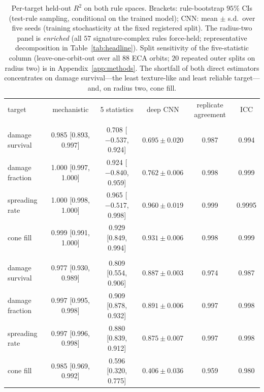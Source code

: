 \documentclass[aip,cha,amsmath,amssymb,reprint,floatfix]{revtex4-2}
\newcommand{\rtwo}{$R^2$}
\begin{document}
\begin{table}[t]
\centering
\begin{ruledtabular}
\begin{tabular}{lccccc}
target & mechanistic & 5 statistics & deep CNN & replicate agreement & ICC \\
\colrule
\multicolumn{6}{l}{\emph{ECA ($18$ held-out orbits)}}\\
damage survival & 0.985 [0.893, 0.997] & 0.708 [$-0.537$, 0.924] & $0.695\pm0.020$ & 0.987 & 0.994 \\
damage fraction & 1.000 [0.997, 1.000] & 0.924 [$-0.840$, 0.959] & $0.762\pm0.006$ & 0.998 & 0.999 \\
spreading rate & 1.000 [0.998, 1.000] & 0.965 [$-0.517$, 0.998] & $0.960\pm0.019$ & 0.999 & 0.9995 \\
cone fill & 0.999 [0.991, 1.000] & 0.929 [0.849, 0.994] & $0.931\pm0.006$ & 0.998 & 0.999 \\
\colrule
\multicolumn{6}{l}{\emph{Radius two ($160$ held-out rules; enriched panel)}}\\
damage survival & 0.977 [0.930, 0.989] & 0.809 [0.554, 0.906] & $0.887\pm0.003$ & 0.974 & 0.987 \\
damage fraction & 0.997 [0.995, 0.998] & 0.909 [0.878, 0.932] & $0.891\pm0.006$ & 0.997 & 0.998 \\
spreading rate & 0.997 [0.996, 0.998] & 0.880 [0.839, 0.912] & $0.875\pm0.007$ & 0.997 & 0.998 \\
cone fill & 0.985 [0.969, 0.992] & 0.596 [0.320, 0.775] & $0.406\pm0.036$ & 0.959 & 0.980 \\
\end{tabular}
\end{ruledtabular}
\caption{Per-target held-out \rtwo{} on both rule spaces. Brackets:
rule-bootstrap $95\%$ CIs (test-rule sampling, conditional on the trained
model); CNN: mean $\pm$ s.d.\ over five seeds (training stochasticity at the
fixed registered split). The radius-two panel is \emph{enriched} (all $57$
signature-complex rules force-held; representative decomposition in
Table~\ref{tab:headline}). Split sensitivity of the five-statistic column
(leave-one-orbit-out over all $88$ ECA orbits; $20$ repeated outer splits on
radius two) is in Appendix~\ref{app:methods}. The shortfall of both direct
estimators concentrates on damage survival---the least texture-like and
least reliable target---and, on radius two, cone fill.}
\label{tab:pertarget}
\end{table}
\end{document}
